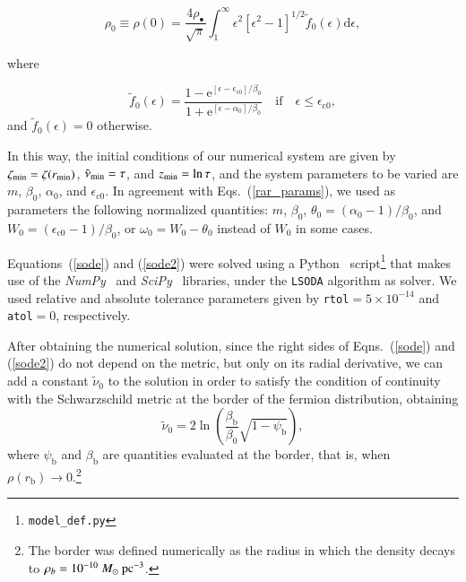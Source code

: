 \documentclass[twocolumn]{aa}
\begin{document}
\begin{appendix}
\begin{equation}
    \rho_0\equiv \rho(0) = \frac{4\rho_{\bullet}}{\sqrt{\pi}}\int^\infty_1\epsilon^2[\epsilon^2-1]^{1/2}\tilde{f}_0(\epsilon)\mathrm{d}\epsilon,
\end{equation}

where

\begin{equation}
\tilde{f}_0(\epsilon)=
      \frac{1-\mathrm {e}^{[\epsilon-\epsilon_\mathrm{c0}]/\beta_0}}
      {1+\mathrm {e}^{[\epsilon-\alpha_0]/\beta_0}}\quad\mathrm{if}\quad \epsilon \leq \epsilon_\mathrm{c0},
\end{equation}
and $\tilde{f}_0(\epsilon)=0$ otherwise.

In this way, the initial conditions of our numerical system are given
by $\zeta_{\rm{min}}=\zeta(r_{\rm{min}})$,
$\tilde{\nu}_{\rm{min}}=\tau$, and $z_{\rm{min}}=\ln{\tau}$, and the system parameters to be varied are $m$, $\beta_0$, $\alpha_0$, and $\epsilon_{c0}$.
In agreement with Eqs.~(\ref{rar_params}), we used as parameters the following normalized quantities: $m$, $\beta_0$, $\theta_0=(\alpha_0-1)/\beta_0$, and $W_0=(\epsilon_{\mathrm{c}0}-1)/\beta_0$, or $\omega_0=W_0-\theta_0$ instead of $W_0$ in some cases.

Equations~(\ref{sode}) and (\ref{sode2}) were solved using
a {\sc Python}~\citep{van1995python} script\footnote{\texttt{model\_def.py}}
that makes use of the {\it NumPy}~\citep{2020SciPy-NMeth} and {\it SciPy}~\citep{harris2020array} libraries, under the \texttt{LSODA} algorithm as solver.  We used relative and absolute tolerance parameters given by \texttt{rtol}$=5\times10^{-14}$ and \texttt{atol}$=0$, respectively.

After obtaining the numerical solution, since the right sides of Eqns.~(\ref{sode}) and (\ref{sode2}) do not depend on the metric, but only on its radial derivative, we can add
a constant $\tilde{\nu}_0$ to the solution in order to satisfy the condition of continuity with the Schwarzschild metric at the border of the fermion distribution, obtaining
\begin{equation}
\tilde{\nu}_0 = 2\ln\left(\frac{\beta_\mathrm{b}}{\beta_0}\sqrt{1-\psi_\mathrm{b}}\right),
\end{equation}
where $\psi_\mathrm{b}$ and $\beta_\mathrm{b}$ are quantities evaluated at the border, that is, when
$\rho(r_\mathrm{b})\rightarrow 0$.\footnote{The border was defined numerically as the radius in which
the density decays to $\rho_b=10^{-10}~M_\odot~\rm{pc}^{-3}$.}


\end{appendix}
\end{document}
